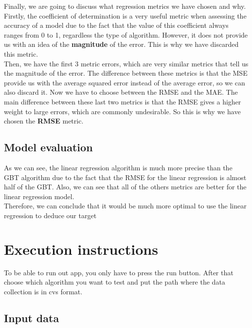 Finally, we are going to discuss what regression metrics we have chosen and why.\\

Firstly, the coefficient of determination is a very useful metric when assessing the accuracy of a model due to the fact that the value of this coefficient always ranges from 0 to 1, regardless the type of algorithm. However, it does not provide us with an idea of the \textbf{magnitude} of the error. This is why we have discarded this metric.\\

Then, we have the first 3 metric errors, which are very similar metrics that tell us the magnitude of the error. The difference between these metrics is that the MSE provide us with the average squared error instead of the average error, so we can also discard it. Now we have to choose between the RMSE and the MAE. The main difference between these last two metrics is that the RMSE gives a higher weight to large errors, which are commonly undesirable. So this is why we have chosen the \textbf{RMSE} metric.

\subsection{Model evaluation}


As we can see, the linear regression algorithm is much more precise than the GBT algorithm due to the fact that the RMSE for the linear regression is almost half of the GBT. Also, we can see that all of the others metrics are better for the linear regression model.\\

Therefore, we can conclude that it would be much more optimal to use the linear regression to deduce our target

\section{Execution instructions}

To be able to run out app, you only have to press the run button. After that choose which algorithm you want to test and put the path where the data collection is in cvs format.

\subsection{Input data}

